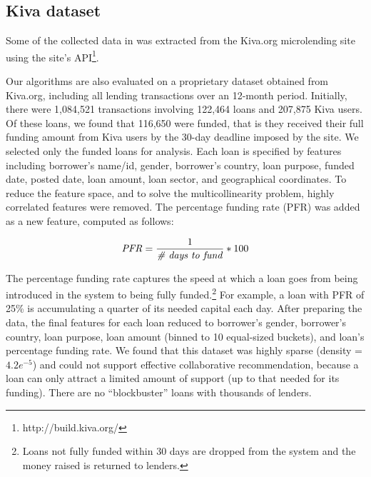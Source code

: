     \subsection{Kiva dataset}
    Some of the collected data in  was extracted from the Kiva.org microlending site using the site's API\footnote{http://build.kiva.org/}.
    
    Our algorithms are also evaluated on a proprietary dataset obtained from Kiva.org, including all lending transactions over an 12-month period. Initially, there were 1,084,521 transactions involving 122,464 loans and 207,875 Kiva users. Of these loans, we found that 116,650 were funded, that is they received their full funding amount from Kiva users by the 30-day deadline imposed by the site. We selected only the funded loans for analysis. Each loan is specified by features including borrower's name/id, gender, borrower's country, loan purpose, funded date, posted date, loan amount, loan sector, and geographical coordinates. 
    To reduce the feature space, and to solve the multicollinearity problem, highly correlated features were removed. The percentage funding rate (PFR) was added as a new feature, computed as follows:
    
    \begin{equation}
     \mbox{\textit{PFR}} =  \frac{1}{\mbox{\textit{{\#} days to fund}}} * 100 
    \end{equation}
    
    The percentage funding rate captures the speed at which a loan goes from being introduced in the system to being fully funded.\footnote{Loans not fully funded within 30 days are dropped from the system and the money raised is returned to lenders.} For example, a loan with PFR of 25\% is accumulating a quarter of its needed capital each day. After preparing the data, the final features for each loan reduced to borrower's gender, borrower's country, loan purpose, loan amount (binned to 10 equal-sized buckets), and loan's percentage funding rate. We found that this dataset was highly sparse (density = $4.2e^{-5}$) and could not support effective collaborative recommendation, because a loan can only attract a limited amount of support (up to that needed for its funding). There are no ``blockbuster'' loans with thousands of lenders.
    
